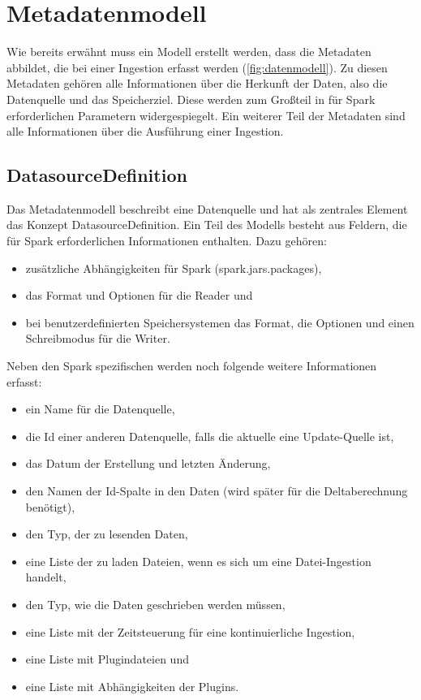 \section{Metadatenmodell}

Wie bereits erwähnt muss ein Modell erstellt werden, dass die Metadaten abbildet, die bei einer Ingestion erfasst werden (\cref{fig:datenmodell}).
Zu diesen Metadaten gehören alle Informationen über die Herkunft der Daten, also die Datenquelle und das Speicherziel.
Diese werden zum Großteil in für Spark erforderlichen Parametern widergespiegelt.
Ein weiterer Teil der Metadaten sind alle Informationen über die Ausführung einer Ingestion.

\subsection{DatasourceDefinition}

Das Metadatenmodell beschreibt eine Datenquelle und hat als zentrales Element das Konzept DatasourceDefinition.
Ein Teil des Modells besteht aus Feldern, die für Spark erforderlichen Informationen enthalten.
Dazu gehören: \begin{itemize}
    \item zusätzliche Abhängigkeiten für Spark (spark.jars.packages),
    \item das Format und Optionen für die Reader und
    \item bei benutzerdefinierten Speichersystemen das Format, die Optionen und einen Schreibmodus für die Writer.
\end{itemize}
Neben den Spark spezifischen werden noch folgende weitere Informationen erfasst: \begin{itemize}
    \item ein Name für die Datenquelle,
    \item die Id einer anderen Datenquelle, falls die aktuelle eine Update-Quelle ist,
    \item das Datum der Erstellung und letzten Änderung,
    \item den Namen der Id-Spalte in den Daten (wird später für die Deltaberechnung benötigt),
    \item den Typ, der zu lesenden Daten,
    \item eine Liste der zu laden Dateien, wenn es sich um eine Datei-Ingestion handelt,
    \item den Typ, wie die Daten geschrieben werden müssen,
    \item eine Liste mit der Zeitsteuerung für eine kontinuierliche Ingestion,
    \item eine Liste mit Plugindateien und
    \item eine Liste mit Abhängigkeiten der Plugins.
\end{itemize}

